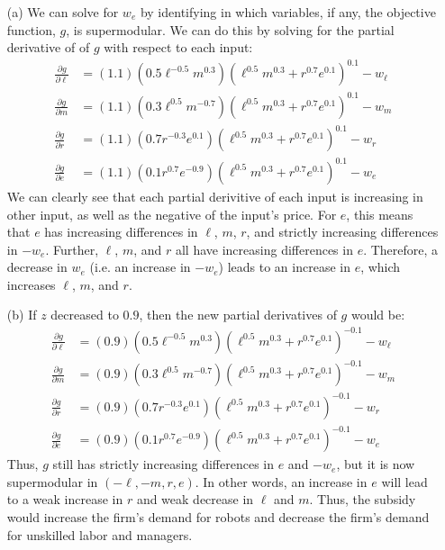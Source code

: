 \documentclass{article}
\begin{document}
\begin{itemize}
	\item[(a)] We can solve for $w_e$ by identifying in which variables, if any, the objective function, $g$, is supermodular. We can do this by solving for the partial derivative of of $g$ with respect to each input:
		\begin{align*}
			\frac{\partial g}{\partial\ell} &= (1.1)\left(0.5\ell^{-0.5}m^{0.3}\right)\left(\ell^{0.5}m^{0.3}+r^{0.7}e^{0.1}\right)^{0.1} 	- w_\ell	\\
			\frac{\partial g}{\partial m} 	&= (1.1)\left(0.3\ell^{0.5}m^{-0.7}\right)\left(\ell^{0.5}m^{0.3}+r^{0.7}e^{0.1}\right)^{0.1} 	- w_m		\\
			\frac{\partial g}{\partial r} 	&= (1.1)\left(0.7r^{-0.3}e^{0.1}\right)\left(\ell^{0.5}m^{0.3}+r^{0.7}e^{0.1}\right)^{0.1} 		- w_r 		\\
			\frac{\partial g}{\partial e} 	&= (1.1)\left(0.1r^{0.7}e^{-0.9}\right)\left(\ell^{0.5}m^{0.3}+r^{0.7}e^{0.1}\right)^{0.1} 		- w_e		
		\end{align*}
		We can clearly see that each partial derivitive of each input is increasing in other input, as well as the negative of the input's price. For $e$, this means that $e$ has increasing differences in $\ell$, $m$, $r$, and strictly increasing differences in $-w_e$. Further, $\ell$, $m$, and $r$ all have increasing differences in $e$. Therefore, a decrease in $w_e$ (i.e. an increase in $-w_e$) leads to an increase in $e$, which increases $\ell$, $m$, and $r$.
		
	\item[(b)] If $z$ decreased to $0.9$, then the new partial derivatives of $g$ would be:
		\begin{align*}
			\frac{\partial g}{\partial\ell} &= (0.9)\left(0.5\ell^{-0.5}m^{0.3}\right)\left(\ell^{0.5}m^{0.3}+r^{0.7}e^{0.1}\right)^{-0.1} 	- w_\ell	\\
			\frac{\partial g}{\partial m} 	&= (0.9)\left(0.3\ell^{0.5}m^{-0.7}\right)\left(\ell^{0.5}m^{0.3}+r^{0.7}e^{0.1}\right)^{-0.1} 	- w_m		\\
			\frac{\partial g}{\partial r} 	&= (0.9)\left(0.7r^{-0.3}e^{0.1}\right)\left(\ell^{0.5}m^{0.3}+r^{0.7}e^{0.1}\right)^{-0.1} 	- w_r 		\\
			\frac{\partial g}{\partial e} 	&= (0.9)\left(0.1r^{0.7}e^{-0.9}\right)\left(\ell^{0.5}m^{0.3}+r^{0.7}e^{0.1}\right)^{-0.1} 	- w_e		
		\end{align*}
		Thus, $g$ still has strictly increasing differences in $e$ and $-w_e$, but it is now supermodular in $(-\ell,-m,r,e)$. In other words, an increase in $e$ will lead to a weak increase in $r$ and weak decrease in $\ell$ and $m$. Thus, the subsidy would increase the firm's demand for robots and decrease the firm's demand for unskilled labor and managers.
		

\end{itemize}
\end{document}
